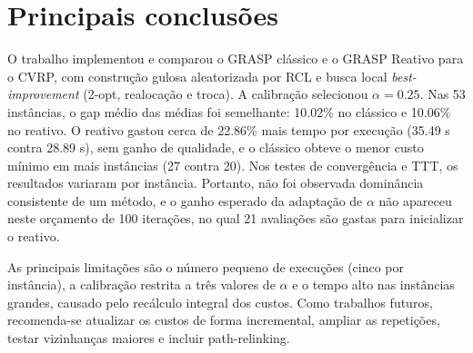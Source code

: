 \section{Principais conclusões}

O trabalho implementou e comparou o GRASP clássico e o GRASP Reativo para o CVRP, com construção gulosa aleatorizada por RCL e busca local \textit{best-improvement} (2-opt, realocação e troca). A calibração selecionou $\alpha=0.25$. Nas 53 instâncias, o gap médio das médias foi semelhante: 10.02\% no clássico e 10.06\% no reativo. O reativo gastou cerca de 22.86\% mais tempo por execução (35.49 s contra 28.89 s), sem ganho de qualidade, e o clássico obteve o menor custo mínimo em mais instâncias (27 contra 20). Nos testes de convergência e TTT, os resultados variaram por instância. Portanto, não foi observada dominância consistente de um método, e o ganho esperado da adaptação de $\alpha$ não apareceu neste orçamento de 100 iterações, no qual 21 avaliações são gastas para inicializar o reativo.

As principais limitações são o número pequeno de execuções (cinco por instância), a calibração restrita a três valores de $\alpha$ e o tempo alto nas instâncias grandes, causado pelo recálculo integral dos custos. Como trabalhos futuros, recomenda-se atualizar os custos de forma incremental, ampliar as repetições, testar vizinhanças maiores e incluir path-relinking.
